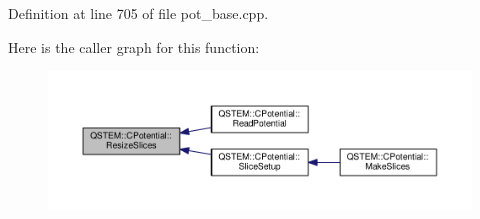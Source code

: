 Definition at line 705 of file pot\-\_\-base.\-cpp.



Here is the caller graph for this function\-:
\nopagebreak
\begin{figure}[H]
\begin{center}
\leavevmode
\includegraphics[width=350pt]{class_q_s_t_e_m_1_1_c_potential_ac038d52b6e988cbbd917f54078249b9c_icgraph}
\end{center}
\end{figure}


